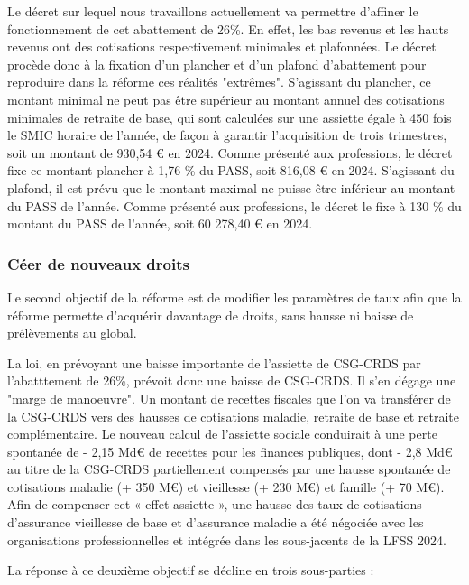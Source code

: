 Le décret sur lequel nous travaillons actuellement va permettre d'affiner le fonctionnement de cet abattement de 26\%. En effet, les bas revenus et les hauts revenus ont des cotisations respectivement minimales et plafonnées. Le décret procède donc à la fixation d'un plancher et d'un plafond d'abattement pour reproduire dans la réforme ces réalités "extrêmes". S’agissant du plancher, ce montant minimal ne peut pas être supérieur au montant annuel des cotisations minimales de retraite de base, qui sont calculées sur une assiette égale à 450 fois le SMIC horaire de l’année, de façon à garantir l’acquisition de trois trimestres, soit un montant de 930,54 € en 2024. Comme présenté aux professions, le décret fixe ce montant plancher à 1,76 \% du PASS, soit 816,08 € en 2024. S’agissant du plafond, il est prévu que le montant maximal ne puisse être inférieur au montant du PASS de l’année. Comme présenté aux professions, le décret le fixe à 130 \% du montant du PASS de l’année, soit 60 278,40 € en 2024.


\subsubsection{Céer de nouveaux droits}

Le second objectif de la réforme est de modifier les paramètres de taux afin que la réforme permette d'acquérir davantage de droits, sans hausse ni baisse de prélèvements au global.

La loi, en prévoyant une baisse importante de l'assiette de CSG-CRDS par l'abatttement de 26\%, prévoit donc une baisse de CSG-CRDS. 
Il s'en dégage une "marge de manoeuvre". Un montant de recettes fiscales que l'on va transférer de la CSG-CRDS vers des hausses de cotisations maladie, retraite de base et retraite complémentaire.
Le nouveau calcul de l’assiette sociale conduirait à une perte spontanée de - 2,15 Md€ de recettes pour les finances publiques, dont - 2,8 Md€ au titre de la CSG-CRDS partiellement compensés par une hausse spontanée de cotisations maladie (+ 350 M€) et vieillesse (+ 230 M€) et famille (+ 70 M€). Afin de compenser cet « effet assiette », une hausse des taux de cotisations d’assurance vieillesse de base et d’assurance maladie a été négociée avec les organisations professionnelles et intégrée dans les sous-jacents de la LFSS 2024.

La réponse à ce deuxième objectif se décline en trois sous-parties : 

